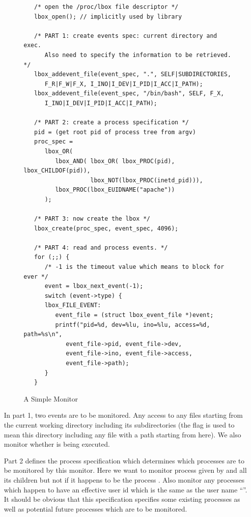 \begin{figure}[ht]
\small
\begin{center}
\begin{verbatim}
   /* open the /proc/lbox file descriptor */
   lbox_open(); // implicitly used by library

   /* PART 1: create events spec: current directory and exec.
      Also need to specify the information to be retrieved. */
   lbox_addevent_file(event_spec, ".", SELF|SUBDIRECTORIES,
      F_R|F_W|F_X, I_INO|I_DEV|I_PID|I_ACC|I_PATH);
   lbox_addevent_file(event_spec, "/bin/bash", SELF, F_X,
      I_INO|I_DEV|I_PID|I_ACC|I_PATH);

   /* PART 2: create a process specification */
   pid = (get root pid of process tree from argv)
   proc_spec = 
      lbox_OR(
         lbox_AND( lbox_OR( lbox_PROC(pid), lbox_CHILDOF(pid)), 
                   lbox_NOT(lbox_PROC(inetd_pid))),
         lbox_PROC(lbox_EUIDNAME("apache"))
      );

   /* PART 3: now create the lbox */
   lbox_create(proc_spec, event_spec, 4096);
 
   /* PART 4: read and process events. */
   for (;;) {
      /* -1 is the timeout value which means to block for ever */
      event = lbox_next_event(-1);
      switch (event->type) {
      lbox_FILE_EVENT:
         event_file = (struct lbox_event_file *)event;
         printf("pid=%d, dev=%lu, ino=%lu, access=%d, path=%s\n",
            event_file->pid, event_file->dev,
            event_file->ino, event_file->access,
            event_file->path);
      }
   }
\end{verbatim}
\end{center}
\caption{A Simple Monitor}
\label{eg-prog}
\end{figure}

In part 1, two events are to be monitored. Any access to any files
starting from the current working directory including its subdirectories
(the  flag is used to mean 
this directory including any file with a path starting from here).
We also monitor whether  is being executed.

Part 2 defines the process specification which determines which processes
are to be monitored by this monitor.
Here we want to monitor process given by  and all its children
but not if it happens to be the process .
Also monitor any processes which happen to have an effective user
id which is the same as the user name ``''.
It should be obvious that this specification specifies some existing
processes as well as potential future processes which are to be monitored.

